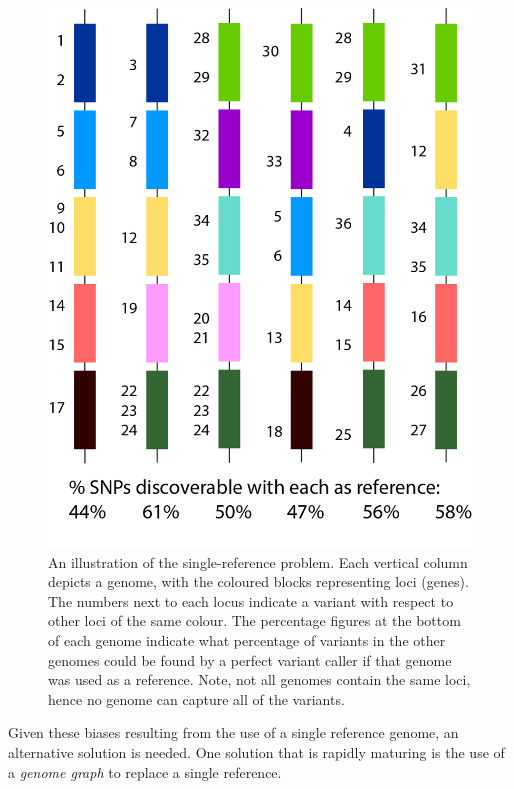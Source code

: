 \begin{figure}
\centering
\includegraphics[height=0.35\textheight]{Chapter0/Figs/single_ref_problem.png}
\caption{An illustration of the single-reference problem. Each vertical column depicts a genome, with the coloured blocks representing loci (genes). The numbers next to each locus indicate a variant with respect to other loci of the same colour. The percentage figures at the bottom of each genome indicate what percentage of variants in the other genomes could be found by a perfect variant caller if that genome was used as a reference. Note, not all genomes contain the same loci, hence no genome can capture all of the variants.}
\label{fig:reference-bias}
\end{figure}

Given these biases resulting from the use of a single reference genome, an alternative solution is needed. One solution that is rapidly maturing is the use of a \emph{genome graph} to replace a single reference.

